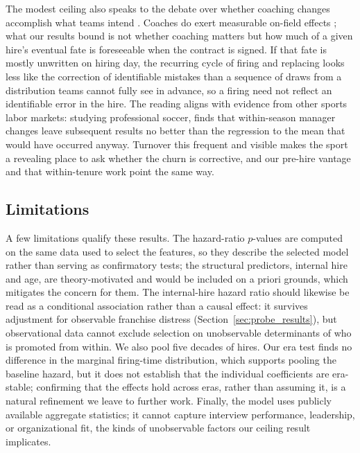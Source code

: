 \documentclass[12pt,USenglish]{article}
\begin{document}
The modest ceiling also speaks to the debate over whether coaching changes accomplish what teams intend \citep{bryson2024}. Coaches do exert measurable on-field effects \citep{cannon2025}; what our results bound is not whether coaching matters but how much of a given hire's eventual fate is foreseeable when the contract is signed. If that fate is mostly unwritten on hiring day, the recurring cycle of firing and replacing looks less like the correction of identifiable mistakes than a sequence of draws from a distribution teams cannot fully see in advance, so a firing need not reflect an identifiable error in the hire. The reading aligns with evidence from other sports labor markets: studying professional soccer, \citet{terweel2011} finds that within-season manager changes leave subsequent results no better than the regression to the mean that would have occurred anyway. Turnover this frequent and visible makes the sport a revealing place to ask whether the churn is corrective, and our pre-hire vantage and that within-tenure work point the same way.

\subsection{Limitations}

A few limitations qualify these results. The hazard-ratio $p$-values are computed on the same data used to select the features, so they describe the selected model rather than serving as confirmatory tests; the structural predictors, internal hire and age, are theory-motivated and would be included on a priori grounds, which mitigates the concern for them. The internal-hire hazard ratio should likewise be read as a conditional association rather than a causal effect: it survives adjustment for observable franchise distress (Section~\ref{sec:probe_results}), but observational data cannot exclude selection on unobservable determinants of who is promoted from within. We also pool five decades of hires. Our era test finds no difference in the marginal firing-time distribution, which supports pooling the baseline hazard, but it does not establish that the individual coefficients are era-stable; confirming that the effects hold across eras, rather than assuming it, is a natural refinement we leave to further work. Finally, the model uses publicly available aggregate statistics; it cannot capture interview performance, leadership, or organizational fit, the kinds of unobservable factors our ceiling result implicates.
\end{document}
